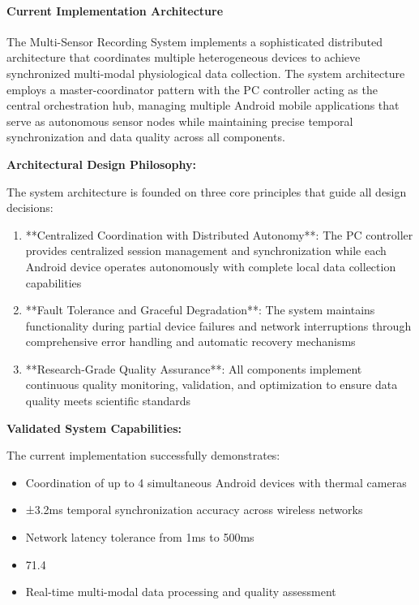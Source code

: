 \documentclass[12pt,a4paper]{report}
\begin{document}
\paragraph{Current Implementation Architecture}

The Multi-Sensor Recording System implements a sophisticated distributed architecture that coordinates multiple
heterogeneous devices to achieve synchronized multi-modal physiological data collection. The system architecture employs
a master-coordinator pattern with the PC controller acting as the central orchestration hub, managing multiple Android
mobile applications that serve as autonomous sensor nodes while maintaining precise temporal synchronization and data
quality across all components.

\textbf{Architectural Design Philosophy:}

The system architecture is founded on three core principles that guide all design decisions:

\begin{enumerate}
\item **Centralized Coordination with Distributed Autonomy**: The PC controller provides centralized session management and
   synchronization while each Android device operates autonomously with complete local data collection capabilities
\item **Fault Tolerance and Graceful Degradation**: The system maintains functionality during partial device failures and
   network interruptions through comprehensive error handling and automatic recovery mechanisms
\item **Research-Grade Quality Assurance**: All components implement continuous quality monitoring, validation, and
   optimization to ensure data quality meets scientific standards

\end{enumerate}
\textbf{Validated System Capabilities:}

The current implementation successfully demonstrates:

\begin{itemize}
\item Coordination of up to 4 simultaneous Android devices with thermal cameras
\item ±3.2ms temporal synchronization accuracy across wireless networks
\item Network latency tolerance from 1ms to 500ms
\item 71.4%
\item Real-time multi-modal data processing and quality assessment

\end{itemize}
\end{document}
